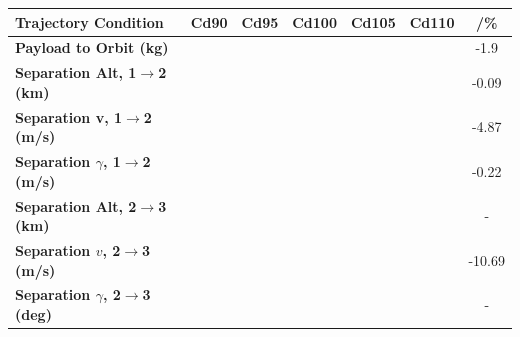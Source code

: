 \begin{table}[ht!]
	\centering
\begin{tabular}{l c c c c c c} 
	\hline \textbf{Trajectory Condition}
	&Cd90
	&Cd95
	&Cd100
	&Cd105
	&Cd110
	& /\%
	\\
	\hline \textbf{Payload to Orbit (kg)}
	& \PayloadToOrbitCdNinetyNoReturn
	& \PayloadToOrbitCdNinetyFiveNoReturn
	& \PayloadToOrbitCdStandardNoReturn
	& \PayloadToOrbitCdOneHundredFiveNoReturn
	& \PayloadToOrbitCdOneHundredTenNoReturn
	&-1.9
	\\
	\textbf{Separation Alt, 1$\rightarrow$2 (km)}
	& \firstsecondSeparationAltCdNinetyNoReturn
	& \firstsecondSeparationAltCdNinetyFiveNoReturn
	& \firstsecondSeparationAltCdStandardNoReturn
	& \firstsecondSeparationAltCdOneHundredFiveNoReturn
	& \firstsecondSeparationAltCdOneHundredTenNoReturn
	&-0.09
	\\
	\textbf{Separation v, 1$\rightarrow$2 (m/s)}
	& \firstsecondSeparationvCdNinetyNoReturn
	& \firstsecondSeparationvCdNinetyFiveNoReturn
	& \firstsecondSeparationvCdStandardNoReturn
	& \firstsecondSeparationvCdOneHundredFiveNoReturn
	& \firstsecondSeparationvCdOneHundredTenNoReturn
	&-4.87
	\\
	\textbf{Separation $\gamma$, 1$\rightarrow$2 (m/s)}
	& \firstsecondSeparationgammaCdNinetyNoReturn
	& \firstsecondSeparationgammaCdNinetyFiveNoReturn
	& \firstsecondSeparationgammaCdStandardNoReturn
	& \firstsecondSeparationgammaCdOneHundredFiveNoReturn
	& \firstsecondSeparationgammaCdOneHundredTenNoReturn
	&-0.22
	\\
	\textbf{Separation Alt, 2$\rightarrow$3 (km)}
	& \secondthirdSeparationAltCdNinetyNoReturn
	& \secondthirdSeparationAltCdNinetyFiveNoReturn
	& \secondthirdSeparationAltCdStandardNoReturn
	& \secondthirdSeparationAltCdOneHundredFiveNoReturn
	& \secondthirdSeparationAltCdOneHundredTenNoReturn
	& -
	\\
	\textbf{Separation $v$, 2$\rightarrow$3 (m/s)}
	& \secondthirdSeparationvCdNinetyNoReturn
	& \secondthirdSeparationvCdNinetyFiveNoReturn
	& \secondthirdSeparationvCdStandardNoReturn
	& \secondthirdSeparationvCdOneHundredFiveNoReturn
	& \secondthirdSeparationvCdOneHundredTenNoReturn
	&-10.69
	\\
	\textbf{Separation $\gamma$, 2$\rightarrow$3 (deg)}
	& \secondthirdSeparationgammaCdNinetyNoReturn
	& \secondthirdSeparationgammaCdNinetyFiveNoReturn
	& \secondthirdSeparationgammaCdStandardNoReturn
	& \secondthirdSeparationgammaCdOneHundredFiveNoReturn
	& \secondthirdSeparationgammaCdOneHundredTenNoReturn
	& -
	\\

\end{tabular}
\end{table}
